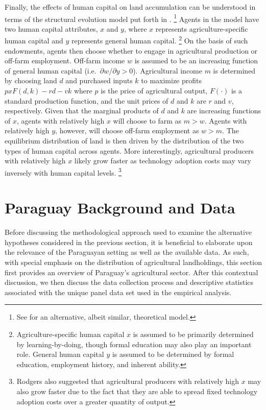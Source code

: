 \documentclass[english]{article}
\begin{document}
Finally, the effects of human capital on land accumulation can be understood
in terms of the structural evolution model put forth in \citet{rodgers1994}.%
\footnote{See \citet{sumner1987} for an alternative, albeit similar, theoretical
model.}
Agents in the model have two human capital attributes, $x$ and $y$, where
$x$ represents agriculture-specific human capital and $y$ represents general 
human capital.%
\footnote{Agriculture-specific human capital $x$ is assumed to be primarily 
determined by learning-by-doing, though formal education may also play an 
important role. 
General human capital $y$ is assumed to be determined by formal education, 
employment history, and inherent ability.}
On the basis of such endowments, agents then choose whether to engage in 
agricultural production or off-farm employment.
Off-farm income $w$ is assumed to be an increasing function of general
human capital (i.e.\ $\partial w/ \partial y > 0$). 
Agricultural income $m$ is determined by choosing land $d$ and purchased 
inputs $k$ to maximize profits $p x F(d,k) - rd - vk$ where $p$ is the price 
of agricultural output, $F(\cdot)$ is a standard production function, 
and the unit prices of $d$ and $k$ are $r$ and $v$, respectively.
Given that the marginal products of $d$ and $k$ are increasing functions of 
$x$, agents with relatively high $x$ will choose to farm as $m > w$.
Agents with relatively high $y$, however, will choose off-farm employment
 as $w > m$.
The equilibrium distribution of land is then driven by the distribution of the 
two types of human capital across agents.
More interestingly, agricultural producers with relatively high $x$ likely 
grow faster as technology adoption costs may vary inversely with human 
capital levels.%
\footnote{Rodgers also suggested that agricultural producers with relatively 
high $x$ may also grow faster due to the fact that they are able to spread fixed 
technology adoption costs over a greater quantity of output.}


\section{Paraguay Background and Data}
\label{sec: data}

Before discussing the methodological approach used to examine the alternative
hypotheses considered in the previous section, it is beneficial to elaborate upon 
the relevance of the Paraguayan setting as well as the available data.
As such, with special emphasis on the distribution of agricultural landholdings, 
this section first provides an overview of Paraguay's agricultural sector. 
After this contextual discussion, we then discuss the data collection process 
and descriptive statistics associated with the unique panel data set used in the 
empirical analysis.
\end{document}
